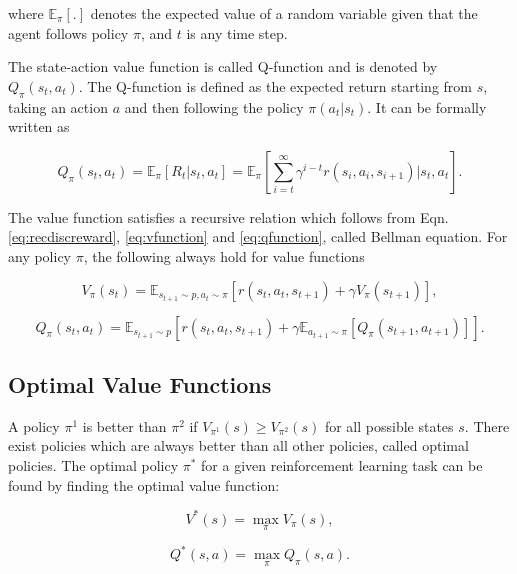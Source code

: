 where $\mathbb{E}_\pi[.]$ denotes the expected value of a random variable given that the agent follows policy $\pi$, and $t$ is any time step.

The state-action value function is called Q-function and is denoted by $Q_\pi(s_t,a_t)$. The Q-function is defined as the expected return starting from $s$, taking an action $a$ and then following the policy $\pi(a_t|s_t)$. It can be formally written as

\begin{equation}
\label{eq:qfunction}
Q_\pi(s_t,a_t) = \mathbb{E}_\pi[R_t|s_t,a_t] = \mathbb{E}_\pi\left[\sum_{i=t}^\infty \gamma^{i-t}r(s_i, a_i, s_{i+1})|s_t, a_t\right].
\end{equation}

The value function satisfies a recursive relation which follows from Eqn. \ref{eq:recdiscreward}, \ref{eq:vfunction} and \ref{eq:qfunction}, called Bellman equation. For any policy $\pi$, the following always hold for value functions

\begin{equation}\label{eq:bellman_v}
V_\pi(s_t) = \mathbb{E}_{s_{t+1}\sim p, a_t \sim \pi}[r(s_t,a_t,s_{t+1}) + \gamma V_\pi(s_{t+1})],
\end{equation}

\begin{equation}\label{eq:bellman_q}
Q_\pi(s_t,a_t) = \mathbb{E}_{s_{t+1}\sim p}[r(s_t,a_t,s_{t+1}) + \gamma\mathbb{E}_{a_{t+1}\sim\pi}[Q_\pi(s_{t+1},a_{t+1})]].
\end{equation}

\subsection{Optimal Value Functions}
A policy $\pi^1$ is better than $\pi^2$ if $V_{\pi^1}(s) \geq V_{\pi^2}(s) $ for all possible states $s$. There exist policies which are always better than all other policies, called optimal policies. The optimal policy $\pi^*$ for a given reinforcement learning task can be found by finding the optimal value function:

\begin{equation}\label{eq:bellmanv_opt}
V^*(s) = \max_\pi V_\pi(s),
\end{equation}

\begin{equation}\label{eq:bellmanq_opt}
Q^*(s,a) = \max_\pi Q_\pi(s,a).
\end{equation}

